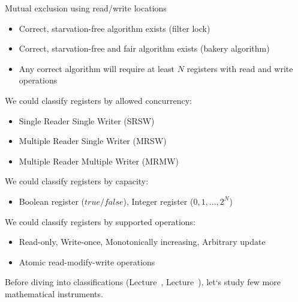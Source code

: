 \begin{frame}[fragile]{Mutual exclusion using read/write locations}

\begin{itemize}
  \item Correct, starvation-free algorithm exists (filter lock)
  \item Correct, starvation-free and fair algorithm exists (bakery algorithm)
  \item Any correct algorithm will require at least $N$ registers with read and write operations
\end{itemize}

\pause
We could classify registers by allowed concurrency:
\begin{itemize}
  \item Single Reader Single Writer (SRSW)
  \item Multiple Reader Single Writer (MRSW)
  \item Multiple Reader Multiple Writer (MRMW)
\end{itemize}

\pause
We could classify registers by capacity:
\begin{itemize}
  \item Boolean register ($true/false$), Integer register ($0, 1, ..., 2^N$)
\end{itemize}

\pause
We could classify registers by supported operations:
\begin{itemize}
  \item Read-only, Write-once, Monotonically increasing, Arbitrary update
  \pause
  \item Atomic read-modify-write operations
\end{itemize}

\pause

Before diving into classifications (Lecture~\foundationsPlusNum, Lecture~\atomicsNum), let`s study few more mathematical instruments.

\end{frame}


